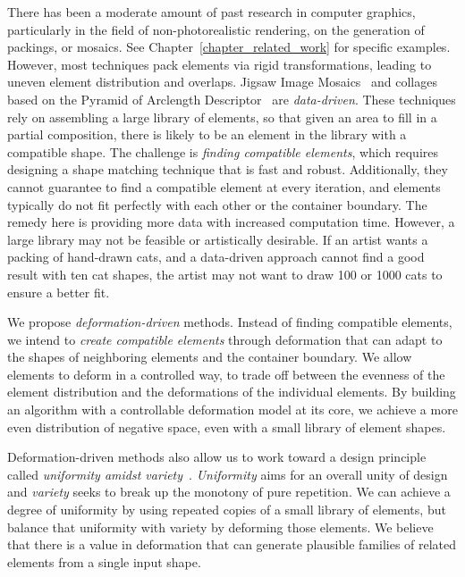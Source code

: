 There has been a moderate amount of past research in computer
graphics, particularly in the field of non-photorealistic rendering,
on the generation of packings, or mosaics.  
See Chapter~\ref{chapter_related_work} for specific examples.  
However,  most techniques pack elements via rigid transformations, leading to
uneven element distribution and overlaps.  
Jigsaw Image Mosaics~\cite{Kim2002} and collages based on the Pyramid of Arclength
Descriptor~\cite{Kwan2016} are \textit{data-driven}.
These techniques rely on assembling a large library of elements, so that given an
area to fill in a partial composition, there is likely to be an
element in the library with a compatible shape.  The challenge is 
\textit{finding compatible elements},
which requires designing a shape matching technique that is fast and robust.
Additionally, they cannot guarantee to find a compatible element
at every iteration, and elements typically do not fit perfectly with each other 
or the container boundary.
The remedy here is providing more data with increased computation time.
However, a large library may not be feasible or artistically desirable.
If an artist wants a packing of hand-drawn cats, and a data-driven approach 
cannot find a good result with ten cat shapes, 
the artist may not want to draw 100 or 1000 cats to ensure a better fit.

We propose \textit{deformation-driven} methods.
Instead of finding compatible elements,
we intend to \textit{create compatible elements} through deformation
that can adapt to the shapes of neighboring elements and the container boundary.
We allow elements to deform in a controlled way,
to trade off between the evenness of the element distribution and 
the deformations of the individual elements.
By building an algorithm with a controllable deformation model at its core, we achieve a
more even distribution of negative space, even with a small library of element shapes.

Deformation-driven methods also allow us to work toward a design principle called \textit{uniformity amidst variety}~\cite{Hutcheson1729, Gombrich}. 
\textit{Uniformity} aims for an overall unity of design and 
\textit{variety} seeks to break up the monotony of pure repetition.
We can achieve a degree of uniformity by using repeated copies of a small library of elements, but balance that uniformity with
variety by deforming those elements. 
We believe that there is a value in deformation that can generate plausible families of related elements from a single input shape.

